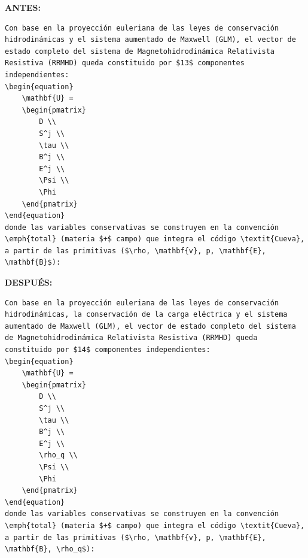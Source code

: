 \documentclass[11pt,a4paper]{article}
\begin{document}
\textcolor{antesline}{\textbf{ANTES:}}
\begin{Verbatim}[breaklines=true, breakanywhere=true, fontsize=\small, frame=leftline, rulecolor=\color{antesline}, framerule=1.2pt]
Con base en la proyección euleriana de las leyes de conservación hidrodinámicas y el sistema aumentado de Maxwell (GLM), el vector de estado completo del sistema de Magnetohidrodinámica Relativista Resistiva (RRMHD) queda constituido por $13$ componentes independientes:
\begin{equation}
    \mathbf{U} =
    \begin{pmatrix}
        D \\
        S^j \\
        \tau \\
        B^j \\
        E^j \\
        \Psi \\
        \Phi
    \end{pmatrix}
\end{equation}
donde las variables conservativas se construyen en la convención \emph{total} (materia $+$ campo) que integra el código \textit{Cueva}, a partir de las primitivas ($\rho, \mathbf{v}, p, \mathbf{E}, \mathbf{B}$):
\end{Verbatim}
\textcolor{despline}{\textbf{DESPUÉS:}}
\begin{Verbatim}[breaklines=true, breakanywhere=true, fontsize=\small, frame=leftline, rulecolor=\color{despline}, framerule=1.2pt]
Con base en la proyección euleriana de las leyes de conservación hidrodinámicas, la conservación de la carga eléctrica y el sistema aumentado de Maxwell (GLM), el vector de estado completo del sistema de Magnetohidrodinámica Relativista Resistiva (RRMHD) queda constituido por $14$ componentes independientes:
\begin{equation}
    \mathbf{U} =
    \begin{pmatrix}
        D \\
        S^j \\
        \tau \\
        B^j \\
        E^j \\
        \rho_q \\
        \Psi \\
        \Phi
    \end{pmatrix}
\end{equation}
donde las variables conservativas se construyen en la convención \emph{total} (materia $+$ campo) que integra el código \textit{Cueva}, a partir de las primitivas ($\rho, \mathbf{v}, p, \mathbf{E}, \mathbf{B}, \rho_q$):
\end{Verbatim}
\end{document}
